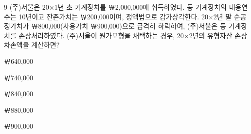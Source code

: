 \begin{question}{9}
(주)서울은 20×1년 초 기계장치를 ￦2,000,000에 취득하였다. 동 기계장치의 내용연수는 10년이고 잔존가치는 ￦200,000이며, 정액법으로 감가상각한다. 20×2년 말 순공정가치가 ￦800,000(사용가치 ￦900,000)으로 급격히 하락하여, (주)서울은 동 기계장치를 손상처리하였다. (주)서울이 원가모형을 채택하는 경우, 20×2년의 유형자산 손상차손액을 계산하면?
\begin{choices}
  \item ￦640,000
  \item ￦740,000
  \item ￦840,000
  \item ￦880,000
  \item ￦900,000
\end{choices}
\end{question}
